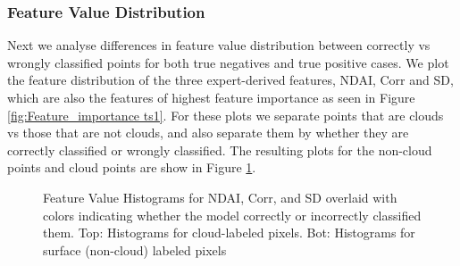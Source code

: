\documentclass[11pt, letterpaper, journal]{IEEEtran}
\begin{document}
\subsubsection{Feature Value Distribution}
Next we analyse differences in feature value distribution between correctly vs wrongly classified points for both true negatives and true positive cases. We plot the feature distribution of the three expert-derived features, NDAI, Corr and SD, which are also the features of highest feature importance as seen in Figure \ref{fig:Feature_importance ts1}. For these plots we separate points that are clouds vs those that are not clouds, and also separate them by whether they are correctly classified or wrongly classified. The resulting plots for the non-cloud points and cloud points are show in Figure \ref{fig:feature_val_compare}.


\begin{figure}[!h]
    \centering
    \qquad
    \caption{Feature Value Histograms for NDAI, Corr, and SD overlaid with colors indicating whether the model correctly or incorrectly classified them. Top: Histograms for cloud-labeled pixels. Bot: Histograms for surface (non-cloud) labeled pixels}
    \label{fig:feature_val_compare}
\end{figure}
\end{document}
